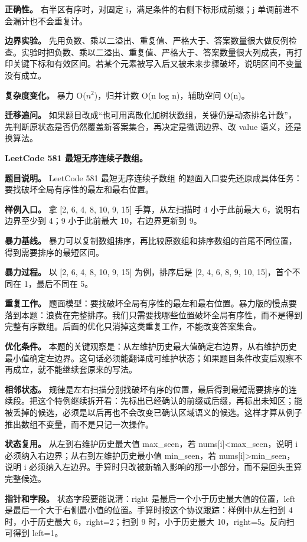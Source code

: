 \textbf{正确性。} 右半区有序时，对固定 i，满足条件的右侧下标形成前缀；j 单调前进不会漏计也不会重复计。

\textbf{边界实验。} 先用负数、乘以二溢出、重复值、严格大于、答案数量很大做反例检查。实验时把负数、乘以二溢出、重复值、严格大于、答案数量很大列成表，再打印关键下标和有效区间。若某个元素被写入后又被未来步骤破坏，说明区间不变量没有成立。

\textbf{复杂度变化。} 暴力 O(\ensuremath{n^{2}})，归并计数 O(n log n)，辅助空间 O(n)。

\textbf{迁移追问。} 如果题目改成“也可用离散化加树状数组，关键仍是动态排名计数”，先判断原状态是否仍然覆盖新答案集合，再决定是微调边界、改 value 语义，还是换算法。

\noindent\textbf{LeetCode 581 最短无序连续子数组。}

\textbf{题目说明。} LeetCode 581 最短无序连续子数组 的题面入口要先还原成具体任务：要找破坏全局有序性的最左和最右位置。

\textbf{样例入口。} 拿 [2, 6, 4, 8, 10, 9, 15] 手算，从左扫描时 4 小于此前最大 6，说明右边界至少到 4；9 小于此前最大 10，右边界更新到 9。

\textbf{暴力基线。} 暴力可以复制数组排序，再比较原数组和排序数组的首尾不同位置，得到需要排序的最短区间。

\textbf{暴力过程。} 以 [2, 6, 4, 8, 10, 9, 15] 为例，排序后是 [2, 4, 6, 8, 9, 10, 15]，首个不同在 1，最后不同在 5。

\textbf{重复工作。} 题面模型：要找破坏全局有序性的最左和最右位置。暴力版的慢点要落到本题：浪费在完整排序。我们只需要找哪些位置破坏全局有序性，而不是得到完整有序数组。后面的优化只消掉这类重复工作，不能改变答案集合。

\textbf{优化条件。} 本题的关键观察是：从左维护历史最大值确定右边界，从右维护历史最小值确定左边界。这句话必须能翻译成可维护状态；如果题目条件改变后观察不再成立，就不能继续套原来的写法。

\textbf{相邻状态。} 规律是左右扫描分别找破坏有序的位置，最后得到最短需要排序的连续段。把这个特例继续拆开看：先标出已经确认的前缀或后缀，再标出未知区；能被丢掉的候选，必须是以后再也不会改变已确认区域语义的候选。这样才算从例子推出数组不变量，而不是只记一次操作。

\textbf{状态复用。} 从左到右维护历史最大值 max\_seen，若 nums[i]<max\_seen，说明 i 必须纳入右边界；从右到左维护历史最小值 min\_seen，若 nums[i]>min\_seen，说明 i 必须纳入左边界。手算时只改被新输入影响的那一小部分，而不是回头重算完整候选。

\textbf{指针和字段。} 状态字段要能说清：right 是最后一个小于历史最大值的位置，left 是最后一个大于右侧最小值的位置。手算时按这个协议跟踪：样例中从左扫到 4 时，小于历史最大 6，right=2；扫到 9 时，小于历史最大 10，right=5。反向扫可得到 left=1。

